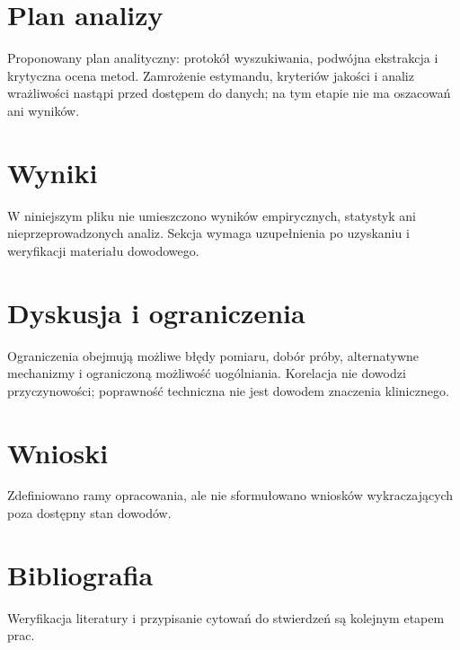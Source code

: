 \documentclass[11pt,a4paper]{article}
\begin{document}
\section{Plan analizy}

Proponowany plan analityczny: protokół wyszukiwania, podwójna ekstrakcja i krytyczna ocena metod. Zamrożenie estymandu, kryteriów jakości i analiz wrażliwości nastąpi przed dostępem do danych; na tym etapie nie ma oszacowań ani wyników.

\section{Wyniki}

W niniejszym pliku nie umieszczono wyników empirycznych, statystyk ani nieprzeprowadzonych analiz. Sekcja wymaga uzupełnienia po uzyskaniu i weryfikacji materiału dowodowego.

\section{Dyskusja i ograniczenia}

Ograniczenia obejmują możliwe błędy pomiaru, dobór próby, alternatywne mechanizmy i ograniczoną możliwość uogólniania. Korelacja nie dowodzi przyczynowości; poprawność techniczna nie jest dowodem znaczenia klinicznego.

\section{Wnioski}

Zdefiniowano ramy opracowania, ale nie sformułowano wniosków wykraczających poza dostępny stan dowodów.

\section*{Bibliografia}

Weryfikacja literatury i przypisanie cytowań do stwierdzeń są kolejnym etapem prac.
\end{document}
